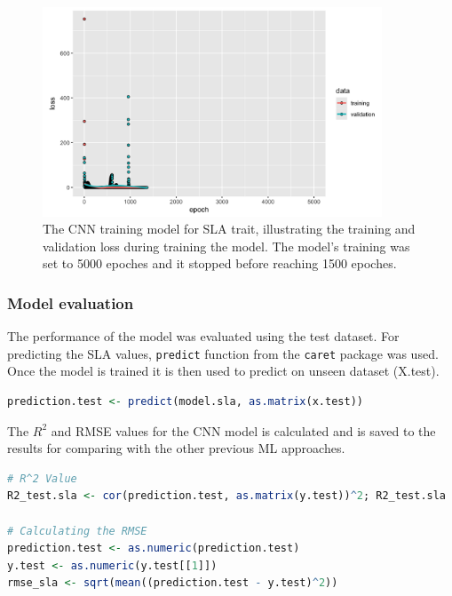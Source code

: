 \documentclass[12pt,a4paper]{report}
\begin{document}
\begin{figure}[h]
    \centering
    \includegraphics[width=0.9\textwidth]{Figures/sla_traing_cnn.png}
    \caption{The CNN training model for SLA trait, illustrating the training and validation loss during training the model. The model's training was set to 5000 epoches and it stopped before reaching 1500 epoches.}
    \label{fig:sla_traing_cnn}
\end{figure}

\subsubsection*{Model evaluation}
The performance of the model was evaluated using the test dataset. For predicting the SLA values, \texttt{predict} function from the \texttt{caret} package was used. Once the model is trained it is then used to predict on unseen dataset (X.test). \\

\begin{lstlisting}[language=R, style=mystyle]
prediction.test <- predict(model.sla, as.matrix(x.test))
\end{lstlisting}

The $R^2$ and RMSE values for the CNN model is calculated and is saved to the results for comparing with the other previous ML approaches. \\

\begin{lstlisting}[language=R, style=mystyle]
# R^2 Value
R2_test.sla <- cor(prediction.test, as.matrix(y.test))^2; R2_test.sla

# Calculating the RMSE
prediction.test <- as.numeric(prediction.test)
y.test <- as.numeric(y.test[[1]])
rmse_sla <- sqrt(mean((prediction.test - y.test)^2))
\end{lstlisting}
\end{document}

